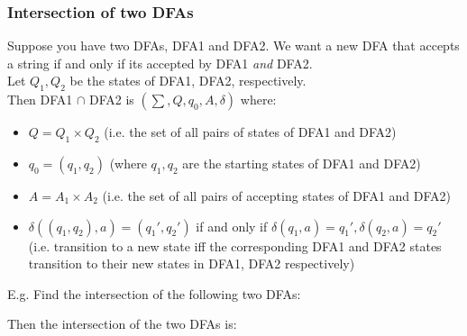\documentclass[12pt, letterpaper]{article}
\begin{document}
\subsubsection{Intersection of two DFAs}
Suppose you have two DFAs, DFA1 and DFA2. We want a new DFA that accepts a string if and only if its accepted by DFA1 \emph{and} DFA2.\\

Let \(Q_1, Q_2\) be the states of DFA1, DFA2, respectively.\\

Then DFA1 \(\cap\) DFA2 is \((\sum, Q, q_0, A, \delta)\) where:
\begin{itemize}
\item \(Q = Q_1 \times Q_2\) (i.e. the set of all pairs of states of DFA1 and DFA2)
\item \(q_0 = (q_1, q_2)\) (where \(q_1, q_2\) are the starting states of DFA1 and DFA2)
\item \(A = A_1 \times A_2\) (i.e. the set of all pairs of accepting states of DFA1 and DFA2)
\item \(\delta((q_1, q_2), a) = (q_1', q_2')\) if and only if \(\delta(q_1, a) = q_1', \delta(q_2, a) = q_2'\) (i.e. transition to a new state iff the corresponding DFA1 and DFA2 states transition to their new states in DFA1, DFA2 respectively)
\end{itemize}

E.g. Find the intersection of the following two DFAs:
\begin{center}
\end{center}

\begin{center}
\end{center}

Then the intersection of the two DFAs is:
\begin{center}
\end{center}
\end{document}
